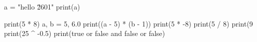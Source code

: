 a = "hello \u{2601}"
print(a)

print(5 * 8)
a, b = 5, 6.0
print((a - 5) * (b - 1))
print(5 * -8)
print(5 / 8)
print(9 %
print(25 ^ -0.5)
print(true or false and false or false)